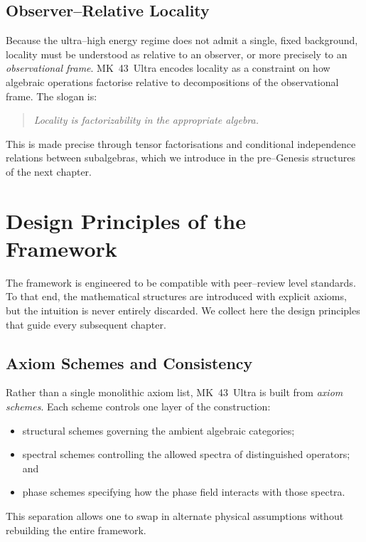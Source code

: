 \subsection{Observer--Relative Locality}
Because the ultra--high energy regime does not admit a single, fixed
background, locality must be understood as relative to an observer, or more
precisely to an \emph{observational frame}. MK~43~Ultra encodes locality as
a constraint on how algebraic operations factorise relative to decompositions
of the observational frame. The slogan is:
\begin{quote}
  \emph{Locality is factorizability in the appropriate algebra.}
\end{quote}
This is made precise through tensor factorisations and conditional
independence relations between subalgebras, which we introduce in the
pre--Genesis structures of the next chapter.

\section{Design Principles of the Framework}
The framework is engineered to be compatible with peer--review level
standards. To that end, the mathematical structures are introduced with
explicit axioms, but the intuition is never entirely discarded. We collect
here the design principles that guide every subsequent chapter.

\subsection{Axiom Schemes and Consistency}
Rather than a single monolithic axiom list, MK~43~Ultra is built from
\emph{axiom schemes}. Each scheme controls one layer of the construction:
\begin{itemize}
  \item structural schemes governing the ambient algebraic categories;
  \item spectral schemes controlling the allowed spectra of distinguished
        operators; and
  \item phase schemes specifying how the phase field interacts with those
        spectra.
\end{itemize}
This separation allows one to swap in alternate physical assumptions without
rebuilding the entire framework.

